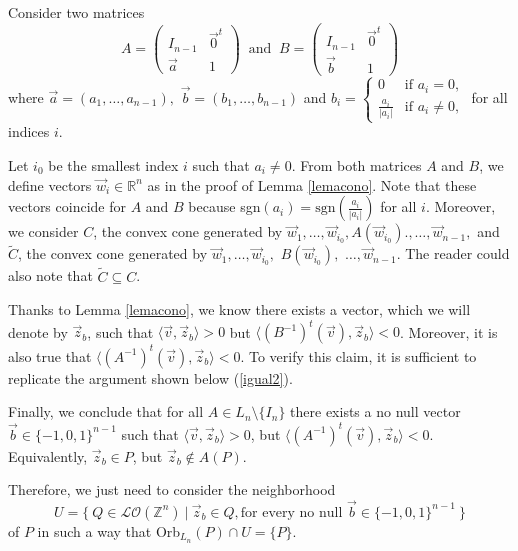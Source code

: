 \documentclass[12pt]{article}
\theoremstyle{definition}
\begin{document}
Consider two matrices
$$A=\left ( 
        \begin{array}{cc}
            I_{n-1} & \vec{0}^t \\
            \vec{a} & 1        \end{array}
        \right )
\ \text{ and }\
B=\left ( 
        \begin{array}{cc}
            I_{n-1} & \vec{0}^t \\
            \vec{b} & 1        \end{array}
        \right )        
$$
where $\vec{a}=(a_1,\dots, a_{n-1}),$ $\vec{b}=(b_1,\dots,b_{n-1})$ and $b_i=\left \{ 
        \begin{array}{cc}
            0 & \text{if }a_i=0, \\
            \frac{a_i}{|a_i|} & \text{if } a_i\neq 0 ,
        \end{array}
        \right .$ for all indices $i$.

Let $i_0$ be the smallest index $i$ such that $a_i\neq 0$. From both matrices $A$ and $B$, we define vectors $\vec{w}_i\in \mathbb{R}^n$ as in the proof of Lemma \ref{lemacono}. Note that these vectors coincide for $A$ and $B$ because sgn$(a_i)=\text{sgn}(\frac{a_i}{|a_i|})$ for all $i$. Moreover, we consider $C$, the convex cone generated by $\vec{w}_1,\dots,\vec{w}_{i_0},A(\vec{w}_{i_0}).,\dots, \vec{w}_{n-1}, $ and $\tilde{C}$, the convex cone generated by $\vec{w}_1,\dots,\vec{w}_{i_0},$ $B(\vec{w}_{i_0}),$ $\dots, \vec{w}_{n-1}.$ The reader could also note that $\tilde{C}\subseteq C$.

Thanks to Lemma \ref{lemacono}, we know there exists a vector, which we will denote by $\vec{z}_b$, such that $\langle\vec{v}, \vec{z}_b\rangle>0$ but $\langle(B^{-1})^t(\vec{v}),\vec{z}_b\rangle<0$. Moreover, it is also true that $\langle(A^{-1})^t(\vec{v}),\vec{z}_b\rangle<0$. To verify this claim, it is sufficient to replicate the argument shown below (\ref{igual2}). 

Finally, we conclude that for all $A\in L_{n}\setminus\{I_n\}$ there exists a no null vector $\vec{b}\in \{-1,0,1\}^{n-1}$ such that $\langle\vec{v},\vec{z}_b\rangle>0$, but $\langle (A^{-1})^t(\vec{v}),\vec{z}_b\rangle<0$.
Equivalently, $\vec{z}_b\in P$, but $\vec{z}_b\not\in A(P)$. 

Therefore, we just need to consider the neighborhood 
$$U=\{\ Q\in \mathcal{LO}(\mathbb{Z}^n)\ |\ \vec{z}_b\in Q, \text{for every no null } \vec{b}\in \{-1,0,1\}^{n-1}\ \}$$ 
of $P$ in such a way that Orb$_{L_n}(P)\cap U=\{P\}$. 
\end{document}
